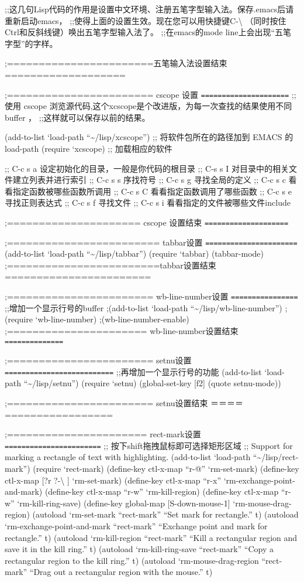 \documentclass[11pt]{article}
\begin{document}
\begin{itemize}
;;这几句Lisp代码的作用是设置中文环境、注册五笔字型输入法。保存.emacs后请重新启动emacs，
;;使得上面的设置生效。现在您可以用快捷键C-\textbackslash{} （同时按住 Ctrl和反斜线键）唤出五笔字型输入法了。
;;在emacs的mode line上会出现“五笔字型”的字样。

;=======================五笔输入法设置结束===================


;======================= cscope 设置 \texttt{=====================}
;;使用 cscope 浏览源代码,这个xcscope是个改进版，为每一次查找的结果使用不同 buffer ，
;;这样就可以保存以前的结果。

(add-to-list `load-path  ``\~{}/lisp/xcscope'') ;; 将软件包所在的路径加到 EMACS 的 load-path
(require `xcscope) ;; 加载相应的软件

;; C-c s a             设定初始化的目录，一般是你代码的根目录
;; C-s s I             对目录中的相关文件建立列表并进行索引
;; C-c s s             序找符号
;; C-c s g             寻找全局的定义
;; C-c s c             看看指定函数被哪些函数所调用
;; C-c s C             看看指定函数调用了哪些函数
;; C-c s e             寻找正则表达式
;; C-c s f             寻找文件
;; C-c s i             看看指定的文件被哪些文件include


;===================== cscope 设置结束 \texttt{====================}


;======================== tabbar设置 \texttt{======================}
(add-to-list `load-path  ``\~{}/lisp/tabbar'')
(require `tabbar)
(tabbar-mode)
;========================tabbar设置结束=======================


;======================= wb-line-number设置 \texttt{================} 
;;增加一个显示行号的buffer
;(add-to-list `load-path  ``\~{}/lisp/wb-line-number'')
;(require `wb-line-number)
;(wb-line-number-enable)
;====================== wb-line-number设置结束 \texttt{==============}

;======================= setnu设置 \texttt{==========================} 
;;再增加一个显示行号的功能
(add-to-list `load-path  ``\~{}/lisp/setnu'')
(require `setnu)
(global-set-key [f2] (quote setnu-mode))

;======================= setnu设置结束 ＝＝＝＝=================


;====================== rect-mark设置 \texttt{=======================}
;; 按下shift拖拽鼠标即可选择矩形区域
;; Support for marking a rectangle of text with highlighting.
(add-to-list `load-path  ``\~{}/lisp/rect-mark'')
(require `rect-mark)
(define-key ctl-x-map ``r\C-@'' `rm-set-mark)
(define-key ctl-x-map [?r ?\C-\textbackslash{} ] `rm-set-mark)
(define-key ctl-x-map ``r\C-x'' `rm-exchange-point-and-mark)
(define-key ctl-x-map ``r\C-w'' `rm-kill-region)
(define-key ctl-x-map ``r\M-w'' `rm-kill-ring-save)
(define-key global-map [S-down-mouse-1] `rm-mouse-drag-region)
(autoload `rm-set-mark ``rect-mark''
  ``Set mark for rectangle.'' t)
(autoload `rm-exchange-point-and-mark ``rect-mark''
  ``Exchange point and mark for rectangle.'' t)
(autoload `rm-kill-region ``rect-mark''
  ``Kill a rectangular region and save it in the kill ring.'' t)
(autoload `rm-kill-ring-save ``rect-mark''
  ``Copy a rectangular region to the kill ring.'' t)
(autoload `rm-mouse-drag-region ``rect-mark''
  ``Drag out a rectangular region with the mouse.'' t)


\end{itemize}
\end{document}
